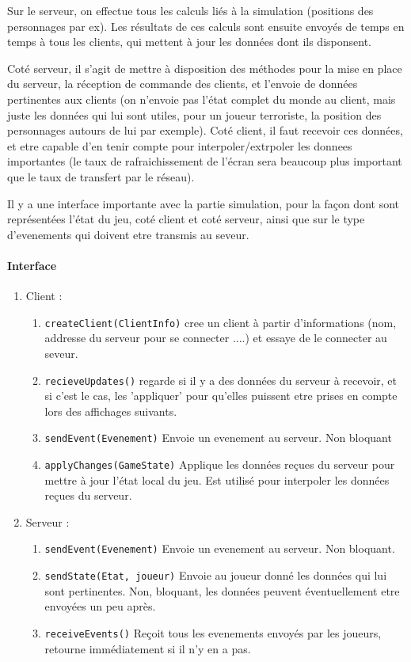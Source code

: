 \documentclass[a4paper,10pt]{article}
\begin{document}
Sur le serveur, on effectue tous les calculs liés à la simulation (positions des personnages par ex). Les résultats de ces calculs sont ensuite envoyés de temps en temps à tous les clients, qui mettent à jour les données dont ils disponsent.

Coté serveur, il s'agit de mettre à disposition des méthodes pour la mise en place du serveur, la réception de commande des clients, et l'envoie de données pertinentes aux clients (on n'envoie pas l'état complet du monde au client, mais juste les données qui lui sont utiles, pour un joueur terroriste, la position des personnages autours de lui par exemple). Coté client, il faut recevoir ces données, et etre capable d'en tenir compte pour interpoler/extrpoler les donnees importantes (le taux de rafraichissement de l'écran sera beaucoup plus important que le taux de transfert par le réseau).

Il y a une interface importante avec la partie simulation, pour la façon dont sont représentées l'état du jeu, coté client et coté serveur, ainsi que sur le type d'evenements qui doivent etre transmis au seveur.
\paragraph{Interface}
\begin{enumerate}
 \item Client : \begin{enumerate}
        \item \verb!createClient(ClientInfo)! cree un client à partir d'informations (nom, addresse du serveur pour se connecter ....) et essaye de le connecter au seveur.
        \item \verb!recieveUpdates()! regarde si il y a des données du serveur à recevoir, et si c'est le cas, les 'appliquer' pour qu'elles puissent etre prises en compte lors des affichages suivants.
        \item \verb!sendEvent(Evenement)! Envoie un evenement au serveur. Non bloquant
        \item \verb!applyChanges(GameState)! Applique les données reçues du serveur pour mettre à jour l'état local du jeu. Est utilisé pour interpoler les données reçues du serveur.
       \end{enumerate}
\item Serveur : \begin{enumerate}
                 \item \verb!sendEvent(Evenement)! Envoie un evenement au serveur. Non bloquant.
                 \item \verb!sendState(Etat, joueur)! Envoie au joueur donné les données qui lui sont pertinentes. Non, bloquant, les données peuvent éventuellement etre envoyées un peu après.
                 \item \verb!receiveEvents()! Reçoit tous les evenements envoyés par les joueurs, retourne immédiatement si il n'y en a pas.
                \end{enumerate}

\end{enumerate}
\end{document}
